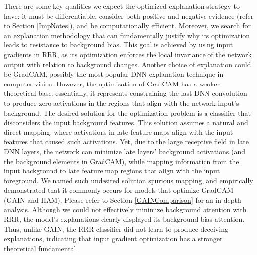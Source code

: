 \documentclass[fleqn,10pt]{wlscirep}
\begin{document}
{There are some key qualities we expect the optimized explanation strategy to have: it must be differentiable, consider both positive and negative evidence (refer to Section \ref{ImpNotes}), and be computationally efficient. Moreover, we search for an explanation methodology that can fundamentally justify why its optimization leads to resistance to background bias. This goal is achieved by using input gradients in RRR, as its optimization enforces the local invariance of the network output with relation to background changes. Another choice of explanation could be GradCAM\cite{GradCAM}, possibly the most popular DNN explanation technique in computer vision. However, the optimization of GradCAM has a weaker theoretical base: essentially, it represents constraining the last DNN convolution to produce zero activations in the regions that align with the network input's background. The desired solution for the optimization problem is a classifier that disconsiders the input background features. This solution assumes a natural and direct mapping, where activations in late feature maps align with the input features that caused such activations. Yet, due to the large receptive field in late DNN layers, the network can minimize late layers' background activations (and the background elements in GradCAM), while mapping information from the input background to late feature map regions that align with the input foreground. We named such undesired solution spurious mapping, and empirically demonstrated that it commonly occurs for models that optimize GradCAM (GAIN and HAM). Please refer to Section \ref{GAINComparison} for an in-depth analysis. Although we could not effectively minimize background attention with RRR, the model's explanations clearly displayed its background bias attention. Thus, unlike GAIN, the RRR classifier did not learn to produce deceiving explanations, indicating that input gradient optimization has a stronger theoretical fundamental.

}
\end{document}

